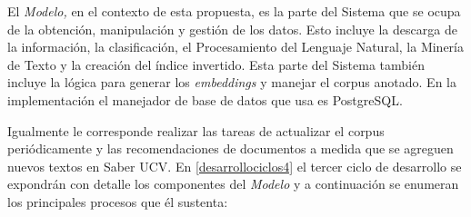 \documentclass[
  12pt,
  openany]{book}
\begin{document}
El \emph{Modelo,} en el contexto de esta propuesta, es la parte del Sistema que se ocupa de la obtención, manipulación y gestión de los datos. Esto incluye la descarga de la información, la clasificación, el Procesamiento del Lenguaje Natural, la Minería de Texto y la creación del índice invertido. Esta parte del Sistema también incluye la lógica para generar los \emph{embeddings} y manejar el corpus anotado. En la implementación el manejador de base de datos que usa es PostgreSQL.

Igualmente le corresponde realizar las tareas de actualizar el corpus periódicamente y las recomendaciones de documentos a medida que se agreguen nuevos textos en Saber UCV. En \ref{desarrollociclos4} el tercer ciclo de desarrollo se expondrán con detalle los componentes del \emph{Modelo} y a continuación se enumeran los principales procesos que él sustenta:
\end{document}
